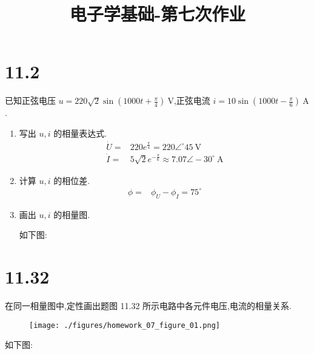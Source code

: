 
\usepackage{../../homeworks_preamble}
\title{电子学基础-第七次作业}


    \maketitle
    \section{11.2} 已知正弦电压 $u=220\sqrt{2}\sin{(1000t+\frac{\pi}{4})}\ \mathrm{V}$,正弦电流 $i=10\sin(1000t-\frac{\pi}{6})\ \mathrm{A}$.
    \begin{enumerate}
        \item 写出 $u,i$ 的相量表达式.
            \begin{align}
                \dot{U}=&220e^{\frac{\pi}{4}}=220\angle ^{\circ}45 \ \mathrm{V}\nonumber\\
                \dot{I}=&5\sqrt{2}e^{-\frac{\pi}{6}}\approx 7.07\angle -30^{\circ} \ \mathrm{A}\nonumber
            \end{align}

        \item 计算 $u,i$ 的相位差.
            \begin{align}
                \phi=&\phi_{U}-\phi_{I}=75^{\circ}\nonumber
            \end{align}

        \item 画出 $u,i$ 的相量图.
            
            如下图:
            \begin{figure}[htbp]
                \centering
            \end{figure}

    \end{enumerate}
    \section{11.32} 在同一相量图中,定性画出题图 11.32 所示电路中各元件电压,电流的相量关系.
    \begin{figure}[htbp]
        \centering
        \texttt{[image: ./figures/homework\_07\_figure\_01.png]}
    \end{figure}

        如下图:
        \begin{figure}[htbp]
        \end{figure}
        
    

